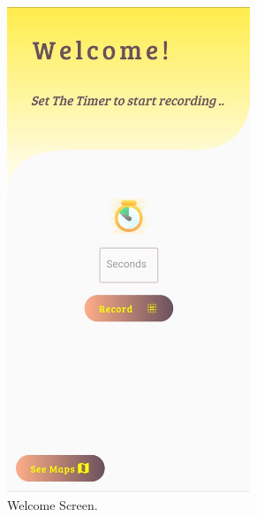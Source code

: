\begin{itemize}
    \begin{figure}[h!]
        \begin{subfigure}{.49\textwidth}
            \center
            \includegraphics[width=0.8\textwidth]{Images/recordingApp/firstScreen.jpg}
            \caption{Welcome Screen.}
            \label{fig:Welcome Screen}
        \end{subfigure}
        \begin{subfigure}{.49\textwidth}
            \center

\end{subfigure}
\end{figure}
\end{itemize}
